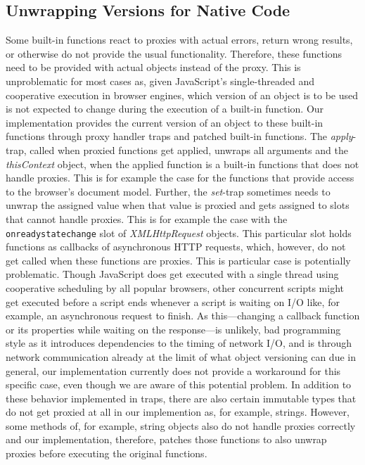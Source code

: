 \subsection{Unwrapping Versions for Native Code}

Some built-in functions react to proxies with actual errors, return wrong results, or otherwise do not provide the usual functionality.
Therefore, these functions need to be provided with actual objects instead of the proxy.
This is unproblematic for most cases as, given JavaScript's single-threaded and cooperative execution in browser engines, which version of an object is to be used is not expected to change during the execution of a built-in function.
Our implementation provides the current version of an object to these built-in functions through proxy handler traps and patched built-in functions.
The \emph{apply}-trap, called when proxied functions get applied, unwraps all arguments and the \emph{thisContext} object, when the applied function is a built-in functions that does not handle proxies.
This is for example the case for the functions that provide access to the browser's document model.
Further, the \emph{set}-trap sometimes needs to unwrap the assigned value when that value is proxied and gets assigned to slots that cannot handle proxies.
This is for example the case with the \lstinline{onreadystatechange} slot of \emph{XMLHttpRequest} objects.
This particular slot holds functions as callbacks of asynchronous HTTP requests, which, however, do not get called when these functions are proxies.
This is particular case is potentially problematic.
Though JavaScript does get executed with a single thread  using cooperative scheduling by all popular browsers, other concurrent scripts might get executed before a script ends whenever a script is waiting on I/O like, for example, an asynchronous request to finish.
As this---changing a callback function or its properties while waiting on the response---is unlikely, bad programming style as it introduces dependencies to the timing of network I/O, and is through network communication already at the limit of what object versioning can due in general, our implementation currently does not provide a workaround for this specific case, even though we are aware of this potential problem. 
In addition to these behavior implemented in traps, there are also certain immutable types that do not get proxied at all in our implemention as, for example, strings.
However, some methods of, for example, string objects also do not handle proxies correctly and our implementation, therefore, patches those functions to also unwrap proxies before executing the original functions.

